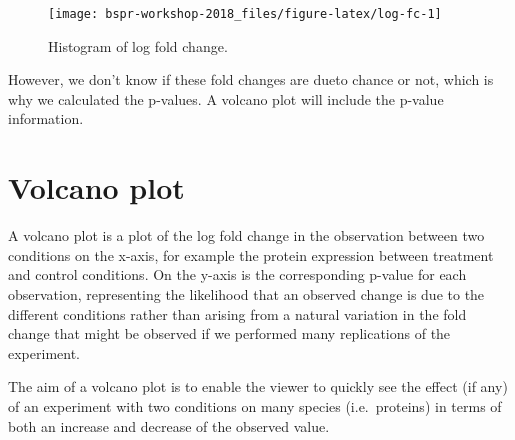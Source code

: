 \documentclass[12pt,]{book}
\newenvironment{Shaded}{\begin{snugshade}}{\end{snugshade}}
\newcommand{\KeywordTok}[1]{\textcolor[rgb]{0.13,0.29,0.53}{\textbf{#1}}}
\newcommand{\DataTypeTok}[1]{\textcolor[rgb]{0.13,0.29,0.53}{#1}}
\newcommand{\FloatTok}[1]{\textcolor[rgb]{0.00,0.00,0.81}{#1}}
\newcommand{\StringTok}[1]{\textcolor[rgb]{0.31,0.60,0.02}{#1}}
\newcommand{\CommentTok}[1]{\textcolor[rgb]{0.56,0.35,0.01}{\textit{#1}}}
\newcommand{\OperatorTok}[1]{\textcolor[rgb]{0.81,0.36,0.00}{\textbf{#1}}}
\newcommand{\NormalTok}[1]{#1}
\theoremstyle{definition}
\theoremstyle{definition}
\theoremstyle{definition}
\theoremstyle{remark}
\begin{document}
\begin{Shaded}
\end{Shaded}

\begin{figure}

{\centering \texttt{[image: bspr-workshop-2018\_files/figure-latex/log-fc-1]} 

}

\caption{Histogram of log fold change.}\label{fig:log-fc}
\end{figure}

However, we don't know if these fold changes are dueto chance or not,
which is why we calculated the p-values. A volcano plot will include the
p-value information.

\section{Volcano plot}\label{volcano-plot}

A volcano plot is a plot of the log fold change in the observation
between two conditions on the x-axis, for example the protein expression
between treatment and control conditions. On the y-axis is the
corresponding p-value for each observation, representing the likelihood
that an observed change is due to the different conditions rather than
arising from a natural variation in the fold change that might be
observed if we performed many replications of the experiment.

The aim of a volcano plot is to enable the viewer to quickly see the
effect (if any) of an experiment with two conditions on many species
(i.e.~proteins) in terms of both an increase and decrease of the
observed value.
\end{document}
